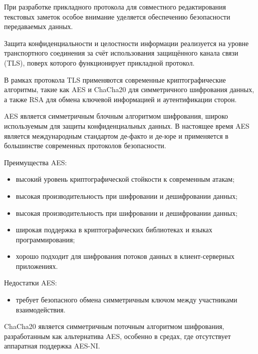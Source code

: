 При разработке прикладного протокола для совместного редактирования текстовых заметок особое внимание уделяется обеспечению безопасности передаваемых данных.

Защита конфиденциальности и целостности информации реализуется на уровне транспортного соединения за счёт использования защищённого канала связи (TLS), поверх которого функционирует прикладной протокол.

В рамках протокола TLS применяются современные криптографические алгоритмы, такие как AES и ChaCha20 для симметричного шифрования данных, а также RSA для обмена ключевой информацией и аутентификации сторон.


AES является симметричным блочным алгоритмом шифрования, широко используемым для защиты конфиденциальных данных. В настоящее время AES является международным стандартом де-факто и де-юре и применяется в большинстве современных протоколов безопасности.

Преимущества AES:

\begin{itemize}
    \item высокий уровень криптографической стойкости к современным атакам;
    \item высокая производительность при шифровании и дешифровании данных;
    \item высокая производительность при шифровании и дешифровании данных;
    \item широкая поддержка в криптографических библиотеках и языках программирования;
    \item хорошо подходит для шифрования потоков данных в клиент-серверных приложениях.
\end{itemize}

Недостатки AES:

\begin{itemize}
    \item требует безопасного обмена симметричным ключом между участниками взаимодействия.
\end{itemize}

ChaCha20 является симметричным поточным алгоритмом шифрования, разработанным как альтернатива AES, особенно в средах, где отсутствует аппаратная поддержка AES-NI.


